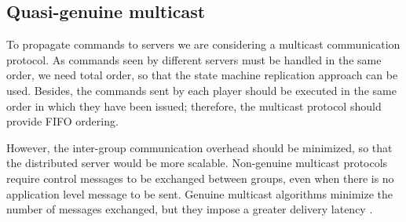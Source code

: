 \documentclass[]{usiinfprospectus}
\begin{document}
%



\subsection{Quasi-genuine multicast} \label{sec:optmcast}

To propagate commands to servers we are considering a multicast communication protocol. 
As commands seen by different servers must be handled in the same order, we need total order, so that the state machine replication approach can be used. Besides, the commands sent by each player should be executed in the same order in which they have been issued; therefore, the multicast protocol should provide FIFO ordering.

However, the inter-group communication overhead should be minimized, so that the distributed server would be more scalable. Non-genuine multicast protocols \cite{schiper2009gng} require control messages to be exchanged between groups, even when there is no application level message to be sent. Genuine multicast algorithms minimize the number of messages exchanged, but they impose a greater delivery latency \cite{schiper2008ica}.
\end{document}
